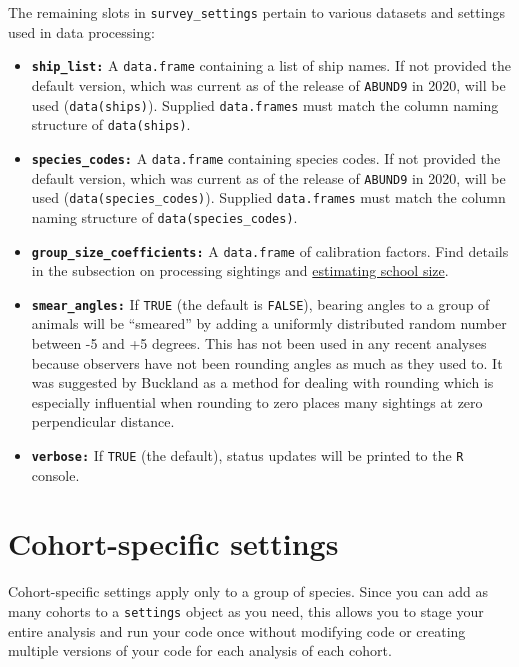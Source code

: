\documentclass[
]{book}
\begin{document}
The remaining slots in \texttt{survey\_settings} pertain to various datasets and settings used in data processing:

\begin{itemize}
\item
  \textbf{\texttt{ship\_list:}} A \texttt{data.frame} containing a list of ship names. If not provided the default version, which was current as of the release of \texttt{ABUND9} in 2020, will be used (\texttt{data(ships)}). Supplied \texttt{data.frames} must match the column naming structure of \texttt{data(ships)}.
\item
  \textbf{\texttt{species\_codes:}} A \texttt{data.frame} containing species codes. If not provided the default version, which was current as of the release of \texttt{ABUND9} in 2020, will be used (\texttt{data(species\_codes)}). Supplied \texttt{data.frames} must match the column naming structure of \texttt{data(species\_codes)}.
\item
  \textbf{\texttt{group\_size\_coefficients:}} A \texttt{data.frame} of calibration factors. Find details in the subsection on processing sightings and \protect\hyperlink{ss_calibration}{estimating school size}.
\item
  \textbf{\texttt{smear\_angles:}} If \texttt{TRUE} (the default is \texttt{FALSE}), bearing angles to a group of animals will be ``smeared'' by adding a uniformly distributed random number between -5 and +5 degrees. This has not been used in any recent analyses because observers have not been rounding angles as much as they used to. It was suggested by Buckland as a method for dealing with rounding which is especially influential when rounding to zero places many sightings at zero perpendicular distance.
\item
  \textbf{\texttt{verbose:}} If \texttt{TRUE} (the default), status updates will be printed to the \texttt{R} console.
\end{itemize}

\hypertarget{cohort-specific-settings}{%
\section*{Cohort-specific settings}\label{cohort-specific-settings}}

Cohort-specific settings apply only to a group of species. Since you can add as many cohorts to a \texttt{settings} object as you need, this allows you to stage your entire analysis and run your code once without modifying code or creating multiple versions of your code for each analysis of each cohort.
\end{document}
